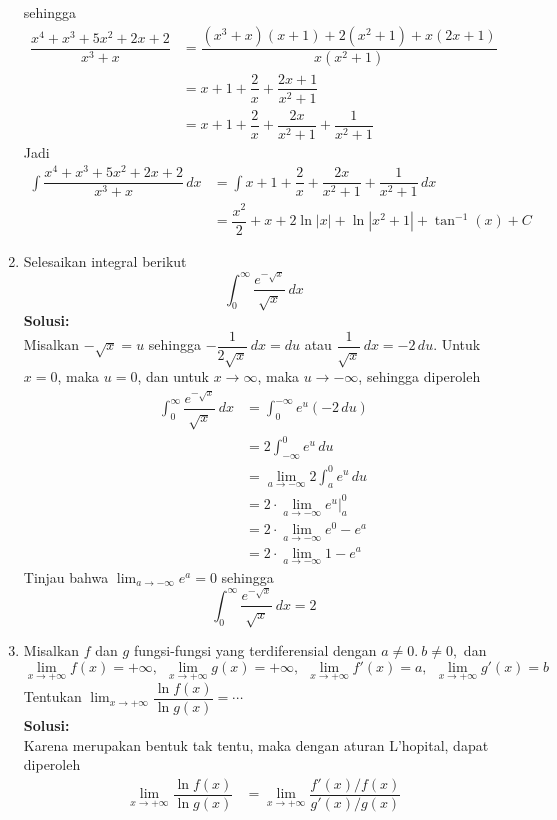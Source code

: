 \documentclass{article}
\begin{document}
\begin{enumerate}
	sehingga
	\begin{align*}
	\dfrac{x^4+x^3+5x^2+2x+2}{x^3+x} &= \dfrac{(x^3+x)(x+1)+2(x^2+1)+x(2x+1)}{x(x^2+1)}\\
	&= x+1 + \dfrac{2}{x} + \dfrac{2x+1}{x^2+1}\\
	&= x+1 + \dfrac{2}{x} + \dfrac{2x}{x^2+1} + \dfrac{1}{x^2+1}
	\end{align*}
	Jadi 
	\begin{align*}
	\int \dfrac{x^4+x^3+5x^2+2x+2}{x^3+x} \, dx &= \int x+1 + \dfrac{2}{x} + \dfrac{2x}{x^2+1} + \dfrac{1}{x^2+1} \, dx\\
	&= \dfrac{x^2}{2} + x +2\ln|x| +\ln|x^2+1| + \tan^{-1}(x) +C 
	\end{align*}
	\item Selesaikan integral berikut $$ \int_0^{\infty} \dfrac{e^{-\sqrt{x}}}{\sqrt{x}}\, dx $$
	\textbf{Solusi:}\\
	Misalkan $-\sqrt{x}=u$ sehingga $-\dfrac{1}{2\sqrt{x}}\, dx = du$ atau $\dfrac{1}{\sqrt{x}} \, dx = -2\, du$. Untuk $x=0$, maka $u=0$, dan untuk $x\rightarrow \infty$, maka $u \rightarrow-\infty$, sehingga diperoleh
	\begin{align*}
	\int_0^{\infty} \dfrac{e^{-\sqrt{x}}}{\sqrt{x}}\, dx &= \int_0^{-\infty} e^{u}(-2\, du)\\
	&= 2\int_{-\infty}^0 e^u \, du\\
	&= \lim_{a\rightarrow -\infty} 2\int_a^0 e^u \, du \\
	&= 2\cdot\lim_{a\rightarrow -\infty} e^u\bigg|^0_a \\
	&= 2\cdot\lim_{a\rightarrow -\infty} e^0-e^a \\
	&= 2\cdot\lim_{a\rightarrow -\infty} 1-e^a
	\end{align*}
	Tinjau bahwa $\displaystyle \lim_{a\rightarrow -\infty}e^a=0$ sehingga $$\int_0^{\infty} \dfrac{e^{-\sqrt{x}}}{\sqrt{x}}\, dx=2$$
	\item Misalkan $f$ dan $g$ fungsi-fungsi yang terdiferensial dengan 
	$a\neq 0.~b\neq 0,$ dan
	$$ \lim_{x\rightarrow +\infty} f(x) = +\infty, ~~\lim_{x\rightarrow +\infty} g(x) = +\infty, ~~\lim_{x\rightarrow +\infty} f'(x) = a,~~ \lim_{x\rightarrow +\infty} g'(x) = b $$
	Tentukan $\displaystyle \lim_{x\rightarrow +\infty} \dfrac{\ln f(x)}{\ln g(x)}=\cdots$\\
	\textbf{Solusi:}\\
	Karena merupakan bentuk tak tentu, maka dengan aturan L'hopital, dapat diperoleh
	\begin{align*}
	\lim_{x\rightarrow +\infty} \dfrac{\ln f(x)}{\ln g(x)} &= \lim_{x\rightarrow +\infty} \dfrac{f'(x)/f(x)}{g'(x)/g(x)} \\

\end{align*}
\end{enumerate}
\end{document}
